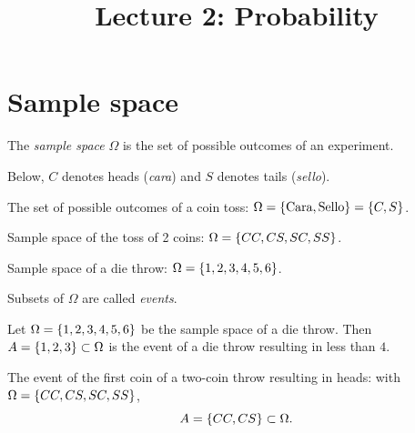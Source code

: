 
\title{Lecture 2: Probability}
\author{}\date{}


\maketitle

\section{Sample space}

\begin{definition}
The \emph{sample space} $\Omega$ is the set of possible outcomes of an experiment.
\end{definition}

Below, $C$ denotes heads (\emph{cara}) and $S$ denotes tails (\emph{sello}).

\begin{example}
The set of possible outcomes of a coin toss: $\Omega = \left\{\text{Cara}, \text{Sello}\right\} = \left\{C, S\right\}$.
\end{example}
\begin{example}
Sample space of the toss of 2 coins: $\Omega = \left\{CC, CS, SC, SS\right\}$.
\end{example}
\begin{example}
Sample space of a die throw: $\Omega = \left\{1,2,3,4,5,6\right\}$.
\end{example}

\begin{definition}[Event]
Subsets of $\Omega$ are called \emph{events}.
\end{definition}

\begin{example}
Let $\Omega = \left\{1,2,3,4,5,6\right\}$ be the sample space of a die throw. Then $A = \left\{1,2,3\right\} \subset \Omega$ is the event of a die throw resulting in less than $4$.
\end{example}
\begin{example}
The event of the first coin of a two-coin throw resulting in heads: with $\Omega = \left\{CC, CS, SC, SS\right\}$,
\[
A = \left\{CC, CS\right\} \subset \Omega.
\]
\end{example}

